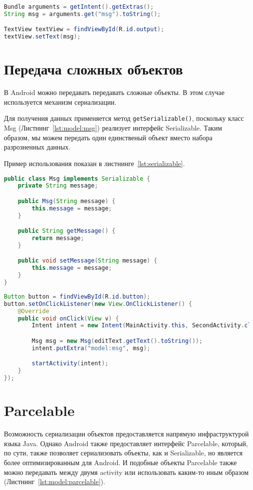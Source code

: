 \begin{lstlisting}[language=Java
	, caption=\leftline{}
	, label=lst:intent:get
	]
Bundle arguments = getIntent().getExtras();
String msg = arguments.get("msg").toString();

TextView textView = findViewById(R.id.output);
textView.setText(msg);
\end{lstlisting}

\section{Передача сложных объектов}
В Android можно передавать передавать сложные объекты.
В этом случае используется механизм сериализации.\par
Для получения данных применяется метод \texttt{getSerializable()},
поскольку класс Msg (Листнинг~\ref{lst:model:msg})
реализует интерфейс Serializable.
Таким образом, мы можем передать один единственый объект вместо набора
разрозненных данных.\par
Пример использования показан в листнинге~\ref{lst:serializable}.

\begin{lstlisting}[language=Java
	, caption=\leftline{}
	, label=lst:model:msg
	]
public class Msg implements Serializable {
	private String message;

	public Msg(String message) {
		this.message = message;
	}

	public String getMessage() {
		return message;
	}

	public void setMessage(String message) {
		this.message = message;
	}
}
\end{lstlisting}

\begin{lstlisting}[language=Java
	, caption=\leftline{}
	, label=lst:serializable
	]
Button button = findViewById(R.id.button);
button.setOnClickListener(new View.OnClickListener() {
	@Override
	public void onClick(View v) {
		Intent intent = new Intent(MainActivity.this, SecondActivity.class);

		Msg msg = new Msg(editText.getText().toString());
		intent.putExtra("model:msg", msg);

		startActivity(intent);
	}
});
\end{lstlisting}

\section{Parcelable}
Возможность сериализации объектов предоставляется напрямую
инфраструктурой языка Java. Однако Android также предоставляет
интерфейс Parcelable, который, по сути, также позволяет сериализовать
объекты, как и Serializable, но является более оптимизированным для
Android. И подобные объекты Parcelable также можно передавать между
двумя activity или использовать каким-то иным образом
(Листнинг~\ref{lst:model:parcelable}).

